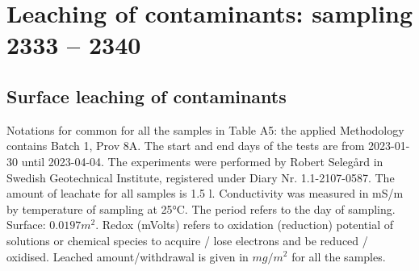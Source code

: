 \documentclass[algorithms,article,submit,pdftex,moreauthors]{Definitions/mdpi}
\begin{document}
\section[\appendixname~\thesection]{Leaching of contaminants: sampling 2333 -- 2340}\label{AppC1}
\subsection[\appendixname~\thesubsection]{Surface leaching of contaminants}

Notations for common for all the samples in Table A5: the applied Methodology contains Batch 1, Prov 8A. The start and end days of the tests are from 2023-01-30 until 2023-04-04. The experiments were performed by Robert Selegård in Swedish Geotechnical Institute, registered under Diary Nr. 1.1-2107-0587. The amount of leachate for all samples is 1.5 l. Conductivity was measured in mS/m by temperature of sampling at 25°C. The period refers to the day of sampling. Surface: $0.0197 m^2$. Redox (mVolts) refers to oxidation (reduction) potential of solutions or chemical species to acquire / lose electrons and be reduced / oxidised. Leached amount/withdrawal is given in $mg/m^2$ for all the samples.
\end{document}
